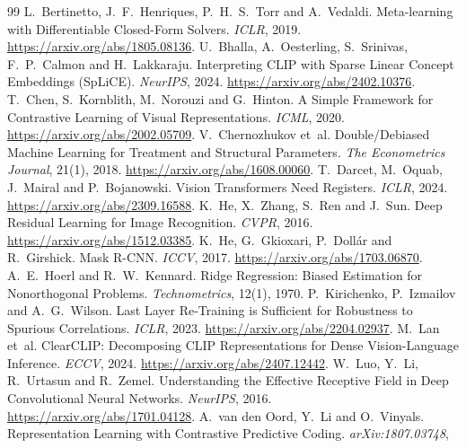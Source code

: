\documentclass[11pt]{article}
\begin{document}
\begingroup
\small
\setlength{\bibsep}{3pt plus 1pt}
\begin{thebibliography}{99}
L.~Bertinetto, J.~F.~Henriques, P.~H.~S.~Torr and A.~Vedaldi. Meta-learning with Differentiable Closed-Form Solvers.
\emph{ICLR}, 2019. \url{https://arxiv.org/abs/1805.08136}.
U.~Bhalla, A.~Oesterling, S.~Srinivas, F.~P.~Calmon and H.~Lakkaraju. Interpreting CLIP with Sparse Linear Concept
Embeddings (SpLiCE). \emph{NeurIPS}, 2024. \url{https://arxiv.org/abs/2402.10376}.
T.~Chen, S.~Kornblith, M.~Norouzi and G.~Hinton. A Simple Framework for Contrastive Learning of Visual Representations.
\emph{ICML}, 2020. \url{https://arxiv.org/abs/2002.05709}.
V.~Chernozhukov et~al. Double/Debiased Machine Learning for Treatment and Structural Parameters. \emph{The Econometrics
Journal}, 21(1), 2018. \url{https://arxiv.org/abs/1608.00060}.
T.~Darcet, M.~Oquab, J.~Mairal and P.~Bojanowski. Vision Transformers Need Registers. \emph{ICLR}, 2024.
\url{https://arxiv.org/abs/2309.16588}.
K.~He, X.~Zhang, S.~Ren and J.~Sun. Deep Residual Learning for Image Recognition. \emph{CVPR}, 2016.
\url{https://arxiv.org/abs/1512.03385}.
K.~He, G.~Gkioxari, P.~Doll\'ar and R.~Girshick. Mask R-CNN. \emph{ICCV}, 2017. \url{https://arxiv.org/abs/1703.06870}.
A.~E.~Hoerl and R.~W.~Kennard. Ridge Regression: Biased Estimation for Nonorthogonal Problems. \emph{Technometrics},
12(1), 1970.
P.~Kirichenko, P.~Izmailov and A.~G.~Wilson. Last Layer Re-Training is Sufficient for Robustness to Spurious
Correlations. \emph{ICLR}, 2023. \url{https://arxiv.org/abs/2204.02937}.
M.~Lan et~al. ClearCLIP: Decomposing CLIP Representations for Dense Vision-Language Inference. \emph{ECCV}, 2024.
\url{https://arxiv.org/abs/2407.12442}.
W.~Luo, Y.~Li, R.~Urtasun and R.~Zemel. Understanding the Effective Receptive Field in Deep Convolutional Neural
Networks. \emph{NeurIPS}, 2016. \url{https://arxiv.org/abs/1701.04128}.
A.~van den Oord, Y.~Li and O.~Vinyals. Representation Learning with Contrastive Predictive Coding. \emph{arXiv:1807.03748},

\end{thebibliography}
\end{document}
